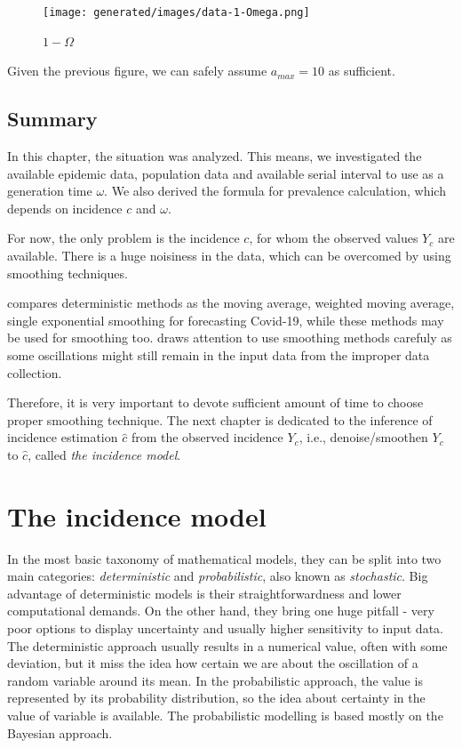\documentclass[
  digital, %
  oneside, %
  lof,     %
  lot,     %
]{fithesis4}
\begin{document}
\begin{figure}[H]
  \begin{center}
    \texttt{[image: generated/images/data-1-Omega.png]}
  \end{center}
  \caption{$1 - \Omega$}
  \label{fig:data-1-Omega}
\end{figure}

Given the previous figure, we can safely assume 
$a_{max} = 10$ as sufficient.


\section{Summary}

In this chapter, the situation was analyzed.
This means, we investigated the available
epidemic data, population data and available
serial interval to use as a generation time $\omega$.
We also derived the formula for prevalence calculation,
which depends on incidence $c$ and $\omega$.

For now, the only problem is the incidence $c$,
for whom the observed values $Y_c$ are available.
There is a huge noisiness in the data, which can be overcomed by using 
smoothing techniques.

\cite{elmousalami2020} compares deterministic
methods as the moving average, weighted 
moving average, single exponential smoothing for 
forecasting Covid-19, while these methods may be used 
for smoothing too. \cite{annunziato2020} draws attention to use smoothing 
methods carefuly as some oscillations might still remain in 
the input data from the improper data collection.

Therefore, it is very important to devote sufficient
amount of time to choose proper smoothing technique.
The next chapter is dedicated to the inference of
incidence estimation $\hat{c}$ from the observed 
incidence $Y_c$, i.e., denoise/smoothen $Y_c$ to $\hat{c}$, called
\textit{the incidence model}.


\chapter{The incidence model}

In the most basic taxonomy of mathematical models, they can be 
split into two main categories: \textit{deterministic} and 
\textit{probabilistic}, also known as \textit{stochastic}. 
Big advantage of deterministic models is their 
straightforwardness and lower computational demands. 
On the other hand, they bring one huge pitfall - very 
poor options to display uncertainty and usually higher 
sensitivity to input data. 
The deterministic approach usually results in a numerical 
value, often with some deviation, but it miss the idea 
how certain we are about the oscillation of a random 
variable around its mean. 
In the probabilistic approach, the value is represented 
by its probability distribution, so the idea about 
certainty in the value of variable is available. 
The probabilistic modelling is based mostly
on the Bayesian approach.
\end{document}
